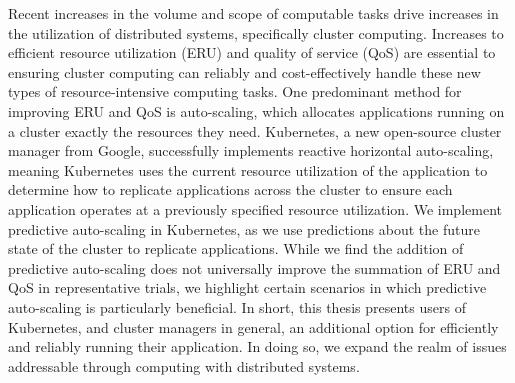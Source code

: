 Recent increases in the volume and scope of computable tasks drive increases in
the utilization of distributed systems, specifically cluster computing.
Increases to efficient resource utilization (ERU) and quality of service (QoS)
are essential to ensuring cluster computing can reliably and cost-effectively handle
these new types of resource-intensive computing tasks. One predominant
method for improving ERU and QoS is auto-scaling,
which allocates applications running on a cluster exactly the
resources they need. Kubernetes, a new open-source cluster manager from
Google, successfully implements reactive horizontal auto-scaling, meaning
Kubernetes uses the current resource utilization of
the application to determine how to
replicate applications across the cluster to ensure each application operates
at a previously specified resource utilization. We implement predictive
auto-scaling in Kubernetes, as we use predictions about the future state
of the cluster to replicate applications. While we find
the addition of predictive auto-scaling does not universally improve the
summation of ERU and QoS in representative trials, we highlight certain
scenarios in which predictive auto-scaling is particularly beneficial. In short,
this thesis presents users of Kubernetes, and cluster managers in general, an
additional option for efficiently and reliably running their application. In
doing so, we expand the realm of issues addressable through computing with
distributed systems.

